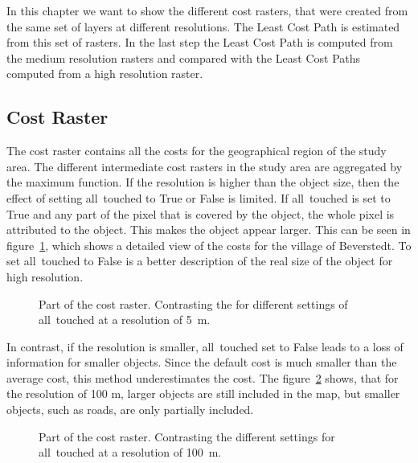 
In this chapter we want to show the different cost rasters, that were created from the same set of layers at different resolutions.
The Least Cost Path is estimated from this set of rasters.
In the last step the Least Cost Path is computed from the medium resolution rasters and compared with the Least Cost Paths computed from a high resolution raster.

\subsection{Cost Raster}\label{subsec:cost-raster}

The cost raster contains all the costs for the geographical region of the study area.
The different intermediate cost rasters in the study area are aggregated by the maximum function.
If the resolution is higher than the object size, then the effect of setting all~touched to True or False is limited.
If all~touched is set to True and any part of the pixel that is covered by the object, the whole pixel is attributed to the object.
This makes the object appear larger.
This can be seen in figure~\ref{fig:costs_5m}, which shows a detailed view of the costs for the village of Beverstedt.
To set all~touched to False is a better description of the real size of the object for high resolution.

\begin{figure}
	\centering

	\qquad
	\caption{Part of the cost raster. Contrasting the for different settings of all~touched at a resolution of 5~m.}
	\label{fig:costs_5m}
\end{figure}

In contrast, if the resolution is smaller, all~touched set to False leads to a loss of information for smaller objects.
Since the default cost is much smaller than the average cost, this method underestimates the cost.
The figure~\ref{fig:costs_100m} shows, that for the resolution of 100 m, larger objects are still included in the map, but smaller objects, such as roads, are only partially included.
\begin{figure}
	\centering

	\qquad
	\caption{Part of the cost raster. Contrasting the different settings for all~touched at a resolution of 100~m.}
	\label{fig:costs_100m}
\end{figure}


